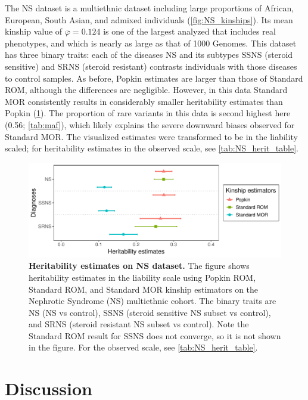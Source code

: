 \documentclass[11pt]{article}
\begin{document}
The NS dataset is a multiethnic dataset including large proportions of African, European, South Asian, and admixed individuals (\cref{fig:NS_kinships}).
Its mean kinship value of $\bar{\varphi} = 0.124$ is one of the largest analyzed that includes real phenotypes, and which is nearly as large as that of 1000 Genomes.
This dataset has three binary traits: each of the diseases NS and its subtypes SSNS (steroid sensitive) and SRNS (steroid resistant) contrasts individuals with those diseases to control samples.
As before, Popkin estimates are larger than those of Standard ROM, although the differences are negligible.
However, in this data Standard MOR consistently results in considerably smaller heritability estimates than Popkin (\cref{fig:NS}).
The proportion of rare variants in this data is second highest here (0.56; \cref{tab:maf}), which likely explains the severe downward biases observed for Standard MOR.
The visualized estimates were transformed to be in the liability scaled; for heritability estimates in the observed scale, see \cref{tab:NS_herit_table}.

\begin{figure}[bp!]
  \centering
  \includegraphics[width=\textwidth]{data/Fig2_NS_sex_array.pdf}
  \caption{
    {\bf Heritability estimates on NS dataset.}
    The figure shows heritability estimates in the liability scale using Popkin ROM, Standard ROM, and Standard MOR kinship estimators on the Nephrotic Syndrome (NS) multiethnic cohort.  The binary traits are NS (NS vs control), SSNS (steroid sensitive NS subset vs control), and SRNS (steroid resistant NS subset vs control).
    Note the Standard ROM result for SSNS does not converge, so it is not shown in the figure.
    For the observed scale, see \cref{tab:NS_herit_table}.
    }
  \label{fig:NS}
\end{figure}

\section{Discussion}
\end{document}
